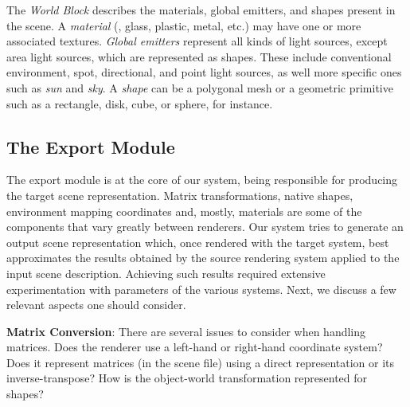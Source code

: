 The \textit{World Block} describes the materials, global emitters, and shapes present in the scene.
%
A {\it material} (\eg, glass, plastic, metal, etc.) may have one or more associated textures. {\it Global emitters} represent all kinds of light sources, except area light sources, which are represented as shapes. These include conventional environment, spot, directional, and point light sources, as well more specific ones such as {\it sun} and {\it sky}.
%
A {\it shape} can be a polygonal mesh or a geometric primitive such as a rectangle, disk, cube, or sphere, for instance. 





\subsection{The Export Module}

The export module is at the core of our system, being responsible for producing the target scene representation. 
Matrix transformations, native shapes, environment mapping coordinates and, mostly, materials are
some of the components that vary greatly between renderers. 
Our system tries to generate an output scene representation which, once rendered with the target system, best approximates the results obtained by the source rendering system applied to the input scene description.  
Achieving such results required extensive experimentation with parameters of the various systems. Next, we discuss a few relevant aspects one should consider.    
  
\textbf{Matrix Conversion}: 
There are several issues to consider when handling matrices.
Does the renderer use a left-hand or right-hand coordinate system? 
Does it represent matrices (in the scene file) using a direct representation or its
inverse-transpose? How is the object-world transformation represented for
shapes?

